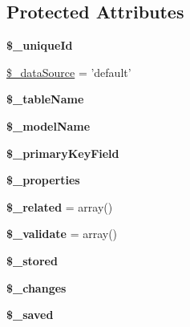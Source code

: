 \subsection*{Protected Attributes}
\begin{DoxyCompactItemize}
\item 
\hypertarget{classModel_aad9adb0b9a2eaf177b36e1420efbdf34}{
{\bfseries \$\_\-uniqueId}}
\label{classModel_aad9adb0b9a2eaf177b36e1420efbdf34}

\item 
\hyperlink{classModel_a9397ae2d97751eff8f73ed7cf747cd86}{\$\_\-dataSource} = 'default'
\item 
\hypertarget{classModel_ab549c6de20616040a9ed609ad13e983d}{
{\bfseries \$\_\-tableName}}
\label{classModel_ab549c6de20616040a9ed609ad13e983d}

\item 
\hypertarget{classModel_abab928eebc4c42fec774e52ad6b81885}{
{\bfseries \$\_\-modelName}}
\label{classModel_abab928eebc4c42fec774e52ad6b81885}

\item 
\hypertarget{classModel_a953ee4b9941da74178a68dcd6043a6c4}{
{\bfseries \$\_\-primaryKeyField}}
\label{classModel_a953ee4b9941da74178a68dcd6043a6c4}

\item 
\hypertarget{classModel_ad3059a8372e09c6c2b7b55dd0ec3a708}{
{\bfseries \$\_\-properties}}
\label{classModel_ad3059a8372e09c6c2b7b55dd0ec3a708}

\item 
\hypertarget{classModel_a478c52723981155ef08c585d403fe976}{
{\bfseries \$\_\-related} = array()}
\label{classModel_a478c52723981155ef08c585d403fe976}

\item 
\hypertarget{classModel_ae08f2c8a5fccea4c3589cd1f66445d3f}{
{\bfseries \$\_\-validate} = array()}
\label{classModel_ae08f2c8a5fccea4c3589cd1f66445d3f}

\item 
\hypertarget{classModel_ab6a5989489e12b800733e5dd3c9f5da1}{
{\bfseries \$\_\-stored}}
\label{classModel_ab6a5989489e12b800733e5dd3c9f5da1}

\item 
\hypertarget{classModel_a53a696fcdf1c9057cb15270556ad32be}{
{\bfseries \$\_\-changes}}
\label{classModel_a53a696fcdf1c9057cb15270556ad32be}

\item 
\hypertarget{classModel_a6b5d8435c7e08f18ae45df5d3a821108}{
{\bfseries \$\_\-saved}}
\label{classModel_a6b5d8435c7e08f18ae45df5d3a821108}


\end{DoxyCompactItemize}
